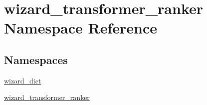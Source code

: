 \hypertarget{namespacewizard__transformer__ranker}{}\section{wizard\+\_\+transformer\+\_\+ranker Namespace Reference}
\label{namespacewizard__transformer__ranker}
\subsection*{Namespaces}
\begin{DoxyCompactItemize}
\item 
 \hyperlink{namespacewizard__transformer__ranker_1_1wizard__dict}{wizard\+\_\+dict}
\item 
 \hyperlink{namespacewizard__transformer__ranker_1_1wizard__transformer__ranker}{wizard\+\_\+transformer\+\_\+ranker}
\end{DoxyCompactItemize}

